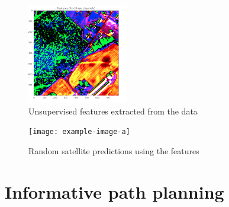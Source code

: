 \begin{figure}
    \centering
    \includegraphics[width=\textwidth]{figs/results/feature_extraction/Screenshot from 2023-05-19 10-03-18.png}
    \caption{Unsupervised features extracted from the data}
    \label{fig:res_unsupervised_feature_qual}
\end{figure}

\begin{figure}
    \centering
    \texttt{[image: example-image-a]}
    \caption{Random satellite predictions using the features}
    \label{fig:sat_predictions}
\end{figure}


\section{Informative path planning}

